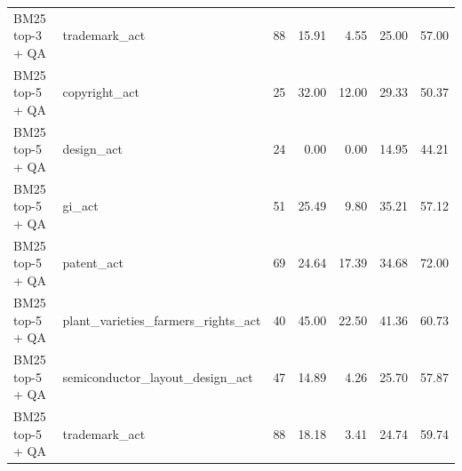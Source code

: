 \begin{table}[htbp]
\begin{tabular}{llrrrrr}
BM25 top-3 + QA & trademark\_act & 88 & 15.91 & 4.55 & 25.00 & 57.00 \\
BM25 top-5 + QA & copyright\_act & 25 & 32.00 & 12.00 & 29.33 & 50.37 \\
BM25 top-5 + QA & design\_act & 24 & 0.00 & 0.00 & 14.95 & 44.21 \\
BM25 top-5 + QA & gi\_act & 51 & 25.49 & 9.80 & 35.21 & 57.12 \\
BM25 top-5 + QA & patent\_act & 69 & 24.64 & 17.39 & 34.68 & 72.00 \\
BM25 top-5 + QA & plant\_varieties\_farmers\_rights\_act & 40 & 45.00 & 22.50 & 41.36 & 60.73 \\
BM25 top-5 + QA & semiconductor\_layout\_design\_act & 47 & 14.89 & 4.26 & 25.70 & 57.87 \\
BM25 top-5 + QA & trademark\_act & 88 & 18.18 & 3.41 & 24.74 & 59.74 \\
\bottomrule
\end{tabular}
\end{table}
